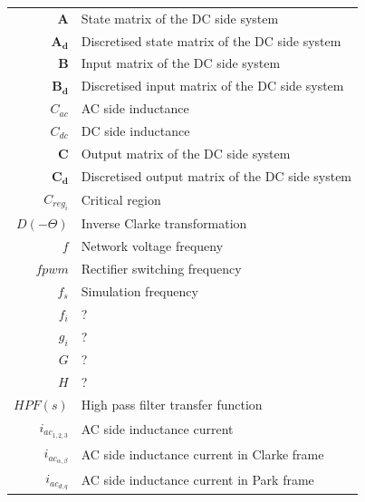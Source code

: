   \begin{scriptsize}
\begin{tabularx}{\textwidth}{r|X}
  $\boldsymbol{A}$                  & State matrix of the DC side system\\
  $\boldsymbol{A_d}$                & Discretised state matrix of the DC side system\\
  $\boldsymbol{B}$                  & Input matrix of the DC side system\\
  $\boldsymbol{B_d}$                & Discretised input matrix of the DC side system\\
  $C_{ac}$                          & AC side inductance\\
  $C_{dc}$                          & DC side inductance\\
  $\boldsymbol{C}$                  & Output matrix of the DC side system\\
  $\boldsymbol{C_d}$                & Discretised output matrix of the DC side system\\
  $C_{reg_i}$                       & Critical region\\
  $D(-\Theta)$                      & Inverse Clarke transformation\\
  $f$                               & Network voltage frequeny\\
  $fpwm$                            & Rectifier switching frequency\\
  $f_s$                             & Simulation frequency\\
  $f_i$                             & ?\\
  $g_i$                             & ?\\
  $G$                               & ?\\
  $H$                               & ?\\
  $HPF(s)$                          & High pass filter transfer function\\
  $i_{ac_{1,2,3}}$                  & AC side inductance current\\
  $i_{ac_{\alpha,\beta}}$           & AC side inductance current in Clarke frame\\
  $i_{ac_{d,q}}$                    & AC side inductance current in Park frame\\

\end{tabularx}
\end{scriptsize}
